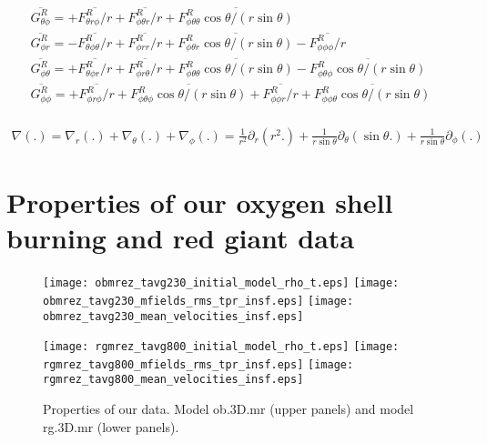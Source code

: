 \documentclass[10pt,paper=a4]{report}
\newcommand{\eht}{\overline}
\begin{document}
\begin{table*}
\begin{align}
  & \eht{G_{\theta \phi}^R} = + \eht{F^R_{\theta r \phi}/r} + \eht{F^R_{\phi \theta r}/r} + \eht{F^R_{\phi \theta \theta} \cos{\theta}/(r\sin{\theta})}  & & \nonumber \\  
  & \eht{G_{\phi r}^R} = - \eht{F^R_{\theta \phi \theta}/r} + \eht{F^R_{\phi rr}/r} + \eht{F^R_{\phi \theta r} \cos{\theta}/(r\sin{\theta})} - \eht{F^R_{\phi \phi \phi}/r}  & & \nonumber \\
  & \eht{G_{\phi \theta}^R} = + \eht{F^R_{\theta \phi r}/r} + \eht{F^R_{\phi r \theta}/r} + \eht{F^R_{\phi \theta \theta} \cos{\theta}/(r\sin{\theta})} - \eht{F^R_{\phi \theta \phi} \cos{\theta}/(r\sin{\theta})}   & & \nonumber \\
  & \eht{G_{\phi \phi}^R} = +\eht{F^R_{\phi r \phi}/r} + \eht{F^R_{\phi \theta \phi} \cos{\theta}/(r\sin{\theta})} + \eht{F^R_{\phi \phi r}/r} + \eht{F^R_{\phi \phi \theta} \cos{\theta}/(r\sin{\theta})}  & & \nonumber \\
\end{align} 

\begin{align}
\nabla (.) = \nabla_r (.) + \nabla_\theta (.) + \nabla_\phi (.) = \frac{1}{r^2} \partial_r (r^2 . ) + \frac{1}{r\sin{\theta}} \partial_\theta (\sin{\theta} . ) + \frac{1}{r\sin{\theta}} \partial_\phi (.) \nonumber
\end{align}
\end{table*}


\clearpage

\section{Properties of our oxygen shell burning and red giant data}

\begin{figure}[!h]
\centerline{
\texttt{[image: obmrez\_tavg230\_initial\_model\_rho\_t.eps]}
\texttt{[image: obmrez\_tavg230\_mfields\_rms\_tpr\_insf.eps]}
\texttt{[image: obmrez\_tavg230\_mean\_velocities\_insf.eps]}}

\centerline{
\texttt{[image: rgmrez\_tavg800\_initial\_model\_rho\_t.eps]}
\texttt{[image: rgmrez\_tavg800\_mfields\_rms\_tpr\_insf.eps]}
\texttt{[image: rgmrez\_tavg800\_mean\_velocities\_insf.eps]}}
\caption{Properties of our data. Model {\sf ob.3D.mr} (upper panels) and model {\sf rg.3D.mr} (lower panels). \label{fig:data}}
\end{figure}
\end{document}
